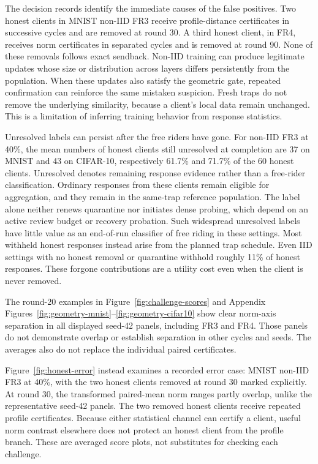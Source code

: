 \documentclass[journal]{IEEEtran}
\makeatletter
\renewcommand{\subsection}{\@startsection{subsection}{2}{\z@}{1.5ex}{0.7ex}{\normalfont\normalsize\itshape}}
\makeatother
\begin{document}
The decision records identify the immediate causes of the false positives.
Two honest clients in MNIST non-IID FR3 receive profile-distance
certificates in successive cycles and are removed at round 30. A third
honest client, in FR4, receives norm certificates in separated cycles
and is removed at round 90. None of these removals follows exact sendback.
Non-IID training can produce legitimate updates whose size or distribution
across layers differs persistently from the population. When these updates
also satisfy the geometric gate, repeated confirmation can reinforce the
same mistaken suspicion. Fresh traps do not remove the underlying
similarity, because a client's local data remain unchanged. This is a
limitation of inferring training behavior from response statistics.

Unresolved labels can persist after the free riders have gone.
For non-IID FR3 at 40\%, the mean numbers of honest clients still
unresolved at completion are 37 on MNIST and 43 on CIFAR-10, respectively
61.7\% and 71.7\% of the 60 honest clients. Unresolved denotes remaining
response evidence rather than a free-rider classification.
Ordinary responses from these clients remain
eligible for aggregation, and they remain in the same-trap reference
population. The label alone neither renews quarantine nor initiates dense
probing, which depend on an active review budget or recovery probation.
Such widespread unresolved labels have little value as an end-of-run
classifier of free riding in these settings.
Most withheld honest responses instead arise from the planned trap
schedule. Even IID settings with no honest removal or quarantine withhold
roughly 11\% of honest responses. These forgone contributions are a
utility cost even when the client is never removed.


\subsection{What the Score Plots Establish}
The round-20 examples in Figure~\ref{fig:challenge-scores} and
Appendix Figures~\ref{fig:geometry-mnist}--\ref{fig:geometry-cifar10} show clear norm-axis separation in all
displayed seed-42 panels, including FR3 and FR4. Those panels do not
demonstrate overlap or establish separation in other cycles and seeds.
The averages also do not replace the individual paired certificates.

Figure~\ref{fig:honest-error} instead examines a recorded error case:
MNIST non-IID FR3 at 40\%, with the two honest clients removed at round 30
marked explicitly. At round 30, the transformed paired-mean norm ranges
partly overlap, unlike the representative seed-42 panels. The two removed
honest clients receive repeated profile certificates. Because either
statistical channel can certify a client, useful norm contrast elsewhere
does not protect an honest client from the profile branch. These are
averaged score plots, not substitutes for checking each challenge.

\end{document}
